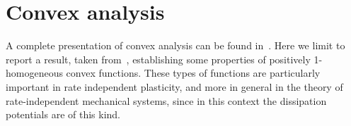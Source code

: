 \documentclass[a4paper,10pt,twoside]{amsbook}
\numberwithin{section}{chapter}
\numberwithin{equation}{chapter}
\theoremstyle{definition}
\newtheorem{ex}[prop]{Example}
\DeclarePairedDelimiter{\norm}{\lVert}{\rVert}
\DeclarePairedDelimiter{\dual}{\langle}{\rangle}
\begin{document}
\section{Convex analysis}

A complete presentation of convex analysis can be found in~\cite{ekeland-temam}. Here we limit to report a result, taken from~\cite{rate-independent-systems}, establishing some properties of positively 1-homogeneous convex functions. These types of functions are particularly important in rate independent plasticity, and more in general in the theory of rate-independent mechanical systems, since in this context the dissipation potentials are of this kind.
\end{document}
